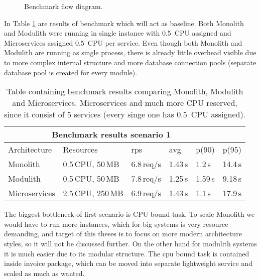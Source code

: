 \begin{figure}
    \centering
    
    \caption{Benchmark flow diagram. \label{img:benchmark_flow}}
\end{figure}

In Table \ref{table:benchmark_baseline} are results of benchmark which will act as baseline. Both Monolith and Modulith were running in single instance with 0.5~CPU assigned and Microservices assigned 0.5~CPU per service. Even though both Monolith and Modulith are running as single process, there is already little overhead visible due to more complex internal structure and more database connection pools (separate database pool is created for every module).

\begin{table}
    \begin{tabular}{ |p{3cm}||p{3cm}|p{1.5cm}|p{1.5cm}|p{1.5cm}|p{1.5cm}| }
        \hline
        \multicolumn{5}{|c|}{Benchmark results scenario 1}                           \\
        \hline
        Architecture  & Resources         & rps        & avg     & p(90)   & p(95)   \\
        \hline
        Monolith      & 0.5\,CPU, 50\,MB  & 6.8\,req/s & 1.43\,s & 1.2\,s  & 14.4\,s \\
        Modulith      & 0.5\,CPU, 50\,MB  & 7.8\,req/s & 1.25\,s & 1.59\,s & 9.18\,s \\
        Microservices & 2.5\,CPU, 250\,MB & 6.9\,req/s & 1.43\,s & 1.1\,s  & 17.9\,s \\
        \hline
    \end{tabular}
    \caption{Table containing benchmark results comparing Monolith, Modulith and Microservices. Microservices and much more CPU reserved, since it consist of 5 services (every singe one has 0.5~CPU assigned).\label{table:benchmark_baseline}}
\end{table}

The biggest bottleneck of first scenario is CPU bound task. To scale Monolith we would have to run more instances, which for big systems is very resource demanding, and target of this theses is to focus on more modern architecture styles, so it will not be discussed further. On the other hand for modulith systems it is much easier due to its modular structure. The cpu bound task is contained inside invoice package, which can be moved into separate lightweight service and scaled as much as wanted.

